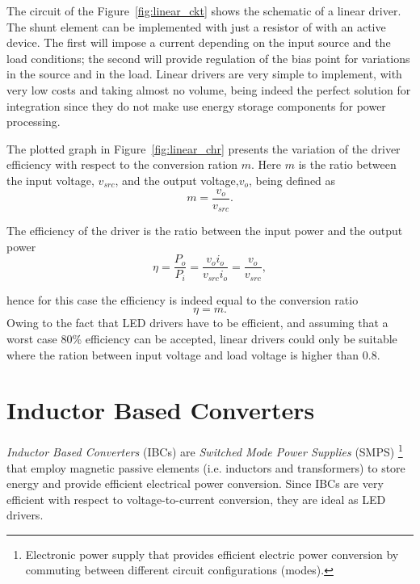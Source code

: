 The circuit of the Figure~\ref{fig:linear_ckt} shows the schematic of a linear driver. The shunt element can be implemented with just a resistor of with an active device. The first will impose a current depending on the input source and the load conditions; the second will provide regulation of the bias point for variations in the source and in the load. Linear drivers are very simple to implement, with very low costs and taking almost no volume, being indeed the perfect solution for integration since they do not make use energy storage components for power processing.

The plotted graph in Figure~\ref{fig:linear_chr} presents the variation of the driver efficiency with respect to the conversion ration $m$. Here $m$  is the ratio between the input voltage, $v_{src}$,  and the output voltage,$v_o$, being defined as
   \begin{equation}
        m = \frac{v_o}{v_{src}}.
   \end{equation}

The efficiency of the driver is the ratio between the input power and the output power
   \begin{equation}
        \eta = \frac{P_o}{P_i} = \frac{v_o i_o}{v_{src} i_o} = \frac{v_o}{v_{src}},
   \end{equation}

hence for this case the efficiency is indeed equal to the conversion ratio
   \begin{equation}
        \eta = m.
   \end{equation}
Owing to the fact that LED drivers have to be efficient, and assuming that a worst case 80\% efficiency can be accepted, linear drivers could only be suitable where the ration between input voltage and load voltage is higher than 0.8.


\section{Inductor Based Converters}

\emph{Inductor Based Converters} (IBCs) are \emph{Switched Mode Power Supplies} (SMPS) \footnote{Electronic power supply that provides efficient electric power conversion by commuting between different circuit configurations (modes).}  that employ magnetic passive elements (i.e. inductors and transformers) to store energy and provide efficient electrical power conversion. Since IBCs are very efficient with respect to voltage-to-current conversion, they are ideal as LED drivers.

